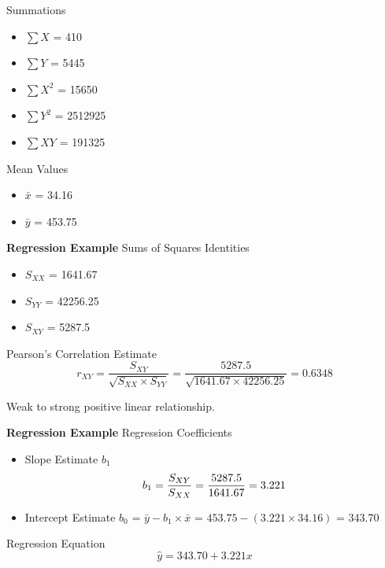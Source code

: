 \documentclass[]{report}
\begin{document}
Summations
\begin{multicols}{2}
	\begin{itemize}
		\item $\sum X$ = 410
		\item $\sum Y$ = 5445
		\item $\sum X^2$ = 15650
		\item $\sum Y^2$ = 2512925
		\item $\sum XY$ = 191325
	\end{itemize}
\end{multicols}
Mean Values
\begin{itemize}
	\item $\bar{x}$ = 34.16
	\item $\bar{y}$ = 453.75
\end{itemize}



\textbf{Regression Example}
Sums of Squares Identities
\begin{itemize}
	\item $S_{XX}$ = 1641.67
	\item $S_{YY}$ = 42256.25
	\item $S_{XY}$ = 5287.5
\end{itemize}
Pearson's Correlation Estimate
\[ r_{XY} = \frac{S_{XY}}{\sqrt{S_{XX} \times S_{YY}}} = \frac{5287.5}{\sqrt{1641.67 \times 42256.25}} = 0.6348 \]

Weak to strong positive linear relationship.


\textbf{Regression Example}
Regression Coefficients
\begin{itemize}
	\item Slope Estimate $b_1$
	\[b_1 = \frac{S_{XY}}{S_{XX}} = {5287.5 \over 1641.67} = 3.221\]
	\item Intercept Estimate $b_0$ = $\bar{y} - b_1 \times \bar{x}$ = $453.75-(3.221\times 34.16)$ = 343.70
\end{itemize}
Regression Equation
\[ \hat{y} = 343.70 + 3.221x \]


\end{document}
